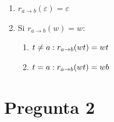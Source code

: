 \documentclass[12pt]{article}
\begin{document}
\begin{enumerate}
    \item $r_{a \to b}(\varepsilon) = \varepsilon$
    \item Si $r_{a \to b}(w) = w$:
    \begin{enumerate}
        \item $t \neq a: \\
        r_{a \to b}(wt) = wt$
        \item $t = a: \\
        r_{a \to b}(wt) = wb$
    \end{enumerate}
\end{enumerate}



\newpage
\section*{Pregunta 2}


\end{document}
